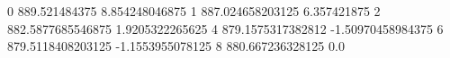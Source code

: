 0 889.521484375 8.854248046875
1 887.024658203125 6.357421875
2 882.5877685546875 1.9205322265625
4 879.1575317382812 -1.50970458984375
6 879.5118408203125 -1.1553955078125
8 880.667236328125 0.0
